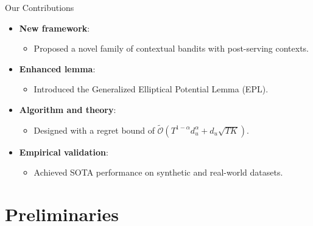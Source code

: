 \documentclass[10pt, xcolor={dvipsnames,x11names},compress]{beamer}
\begin{document}
\begin{frame}{Our Contributions}
\begin{itemize}
    \item \textbf{New framework}: 
    \begin{itemize}
        \item Proposed a novel family of contextual bandits with post-serving contexts.
    \end{itemize}
    \item \textbf{Enhanced lemma}: 
    \begin{itemize}
        \item Introduced the Generalized Elliptical Potential Lemma (EPL).
    \end{itemize}
    \item \textbf{Algorithm and theory}: 
    \begin{itemize}
        \item Designed \textbf{\polinucb} with a regret bound of \( \widetilde{\mathcal{O}}(T^{1-\alpha}d_u^{\alpha} + d_u\sqrt{T K })\).
    \end{itemize}
    \item \textbf{Empirical validation}: 
    \begin{itemize}
        \item Achieved SOTA performance on synthetic and real-world datasets.
    \end{itemize}
\end{itemize}


\end{frame}




\section{Preliminaries}


\end{document}

